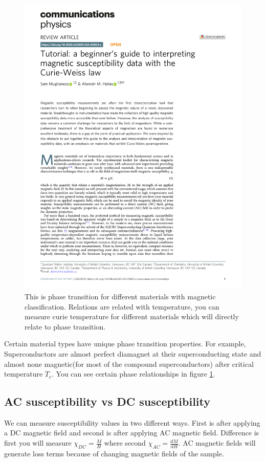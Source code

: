 \begin{figure}
\centering\includegraphics[width=\textwidth, page=5, trim={1cm 22cm 1cm 1.2cm}, clip ]{phasefig.pdf}
\caption{This is phase transition for different materials with magnetic classification. Relations are related with temperature, you can measure curie temperature for different materials which will directly relate to phase transition.\cite{Mugiraneza2022}}
\label{fig:phasefig}
\end{figure}

Certain material types have unique phase transition properties. For example, Superconductors are almost perfect diamagnet at their superconducting state and almost none magnetic(for most of the compound superconductors) after critical temperature $T_c$. You can see certain phase relationships in figure \ref{fig:phasefig}\cite{Mugiraneza2022}. 

\subsection{AC susceptibility vs DC susceptibility}
We can measure susceptibility values in two different ways. First is after applying a DC magnetic field and second is after applying AC magnetic field. Difference is first you will measure $\chi_{DC} = \frac{M}{H}$ where second $\chi_{AC} = \frac{dM}{dH}$.
AC magnetic fields will generate loss terms because of changing magnetic fields of the sample. 

